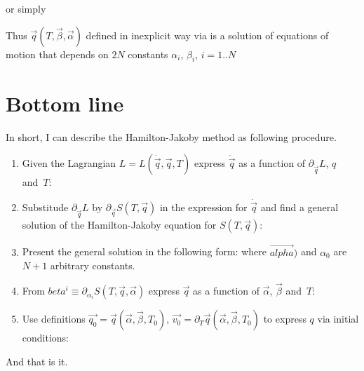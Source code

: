 \documentclass{article}
\begin{document}
or simply

Thus $\vec{q}(T, \vec{\beta}, \vec{\alpha})$ defined in inexplicit way
via  is a solution of equations of motion 
that depends on $2N$ constants $\alpha_i$, $\beta_i$, $i=1..N$

\par

\section{Bottom line}

In short, I can describe the Hamilton-Jakoby method as following procedure.

\begin{enumerate}
\item
Given the Lagrangian $L=L(\dot{\vec{q}}, \vec{q}, T)$ express $\dot{\vec{q}}$
as a function of $\partial_{\dot{\vec{q}}}L$, $q$ and~$T$:

\item
Substitude $\partial_{\dot{\vec{q}}}L$ by $\partial_{\vec{q}}S(T, \vec{q})$
in the expression for $\dot{\vec{q}}$ and find a general solution 
of the Hamilton-Jakoby equation  for $S(T, \vec{q})$:


\item
Present the general solution in the following form:
where $\vec{alpha})$ and $\alpha_0$ are $N+1$ arbitrary constants.

\item

From $beta^i \equiv \partial_{\alpha_i} S(T, \vec{q}, \vec{\alpha})$ express
$\vec{q}$ as a function of $\vec{\alpha}$, $\vec{\beta}$ and~$T$:

\item

Use definitions $\vec{q_0} = \vec{q}(\vec{\alpha}, \vec{\beta}, T_0)$, 
$\vec{v_0} = \partial_T \vec{q}(\vec{\alpha}, \vec{\beta}, T_0)$ to express
$q$ via initial conditions:

\end{enumerate}

And that is it.
\end{document}
